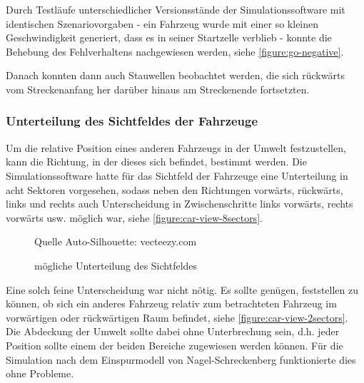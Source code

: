 Durch Testläufe unterschiedlicher Versionsstände der Simulationssoftware mit identischen Szenariovorgaben - ein Fahrzeug wurde mit einer so kleinen Geschwindigkeit generiert, dass es in seiner Startzelle verblieb - konnte die Behebung des Fehlverhaltens nachgewiesen werden, siehe \cref{figure:go-negative}.

Danach konnten dann auch Stauwellen beobachtet werden, die sich rückwärts vom Streckenanfang her darüber hinaus am Streckenende fortsetzten.



\subsubsection{Unterteilung des Sichtfeldes der Fahrzeuge}
\label{sec:unterteilung-sichtfeld}

Um die relative Position eines anderen Fahrzeugs in der Umwelt festzustellen, kann die Richtung, in der dieses sich befindet, bestimmt werden.
Die Simulationssoftware hatte für das Sichtfeld der Fahrzeuge eine Unterteilung in acht Sektoren vorgesehen, sodass neben den Richtungen vorwärts, rückwärts, links und rechts auch Unterscheidung in Zwischenschritte links vorwärts, rechts vorwärts usw. möglich war, siehe \cref{figure:car-view-8sectors}.

\begin{figure}[hptb]
  \centering 
   \qquad 
   \qquad 
  \caption[mögliche Unterteilung des Sichtfeldes]
          {mögliche Unterteilung des Sichtfeldes}
          {\footnotesize Quelle Auto-Silhouette: vecteezy.com} 
  \label{figure:car-view-sectors}
\end{figure}

Eine solch feine Unterscheidung war nicht nötig.
Es sollte genügen, feststellen zu können, ob sich ein anderes Fahrzeug relativ zum betrachteten Fahrzeug im vorwärtigen oder rückwärtigen Raum befindet, siehe \cref{figure:car-view-2sectors}. 
Die Abdeckung der Umwelt sollte dabei ohne Unterbrechung sein, d.h. jeder Position sollte einem der beiden Bereiche zugewiesen werden können.
Für die Simulation nach dem Einspurmodell von Nagel-Schreckenberg funktionierte dies ohne Probleme.

